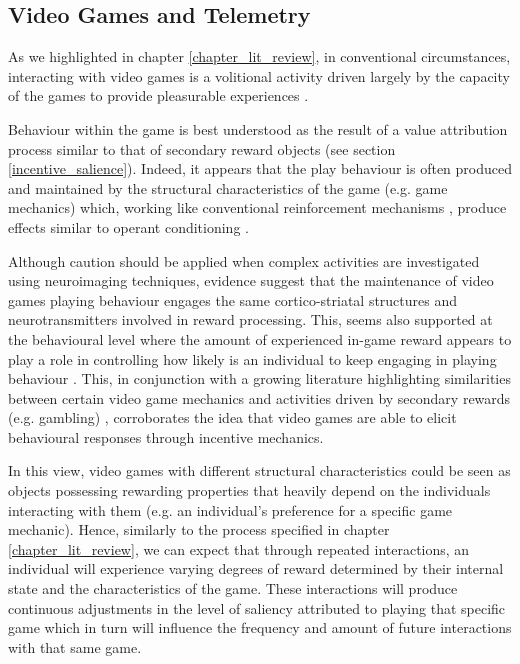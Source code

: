 \subsection{Video Games and Telemetry}
\label{videogame_telemetries}
As we highlighted in chapter \ref{chapter_lit_review}, in conventional circumstances, interacting with video games is a volitional activity driven largely by the capacity of the games to provide pleasurable experiences \cite{boyle2012engagement}. 

Behaviour within the game is best understood as the result of a value attribution process similar to that of secondary reward objects (see section \ref{incentive_salience}). Indeed, it appears that the play behaviour is often produced and maintained by the structural characteristics of the game (e.g. game mechanics) \cite{king2010video} which, working like conventional reinforcement mechanisms \cite{chumbley2006affect,wang2011game,phillips2013videogame,avserivskis2017computational}, produce effects similar to operant conditioning \cite{skinner1965science}. 

Although caution should be applied when complex activities are investigated using neuroimaging techniques, evidence suggest that the maintenance of video games playing behaviour engages the same cortico-striatal structures \cite{hoeft2008gender,mathiak2011reward,cole2012interactivity,klasen2012neural,lorenz2015video,gleich2017functional} and neurotransmitters \cite{koepp1998evidence} involved in reward processing. This, seems also supported at the behavioural level where the amount of experienced in-game reward appears to play a role in controlling how likely is an individual to keep engaging in playing behaviour \cite{agarwal2017quitting, steyvers2019joint}. This, in conjunction with a growing literature highlighting similarities between certain video game mechanics and activities driven by secondary rewards (e.g. gambling) \cite{king2010role,drummond2018video,zendle2018video}, corroborates the idea that video games are able to elicit behavioural responses through incentive mechanics. 

In this view, video games with different structural characteristics could be seen as objects possessing rewarding properties that heavily depend on the individuals interacting with them (e.g. an individual's preference for a specific game mechanic). Hence, similarly to the process specified in chapter \ref{chapter_lit_review}, we can expect that through repeated interactions, an individual will experience varying degrees of reward determined by their internal state and the characteristics of the game. These interactions will produce continuous adjustments in the level of saliency attributed to playing that specific game which in turn will influence the frequency and amount of future interactions with that same game. 

